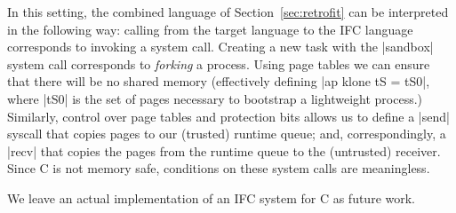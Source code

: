 In this setting, the combined language of Section~\ref{sec:retrofit}
can be interpreted in the following way: calling from the target
language to the IFC language corresponds to invoking a system call.
%
Creating a new task with the |sandbox| system call corresponds to
\emph{forking} a process.  Using page tables we can ensure that
there will be no shared memory
(effectively
defining |ap klone tS
= tS0|, where |tS0| is the set of pages necessary to bootstrap a
lightweight process.)
%
Similarly, control over page tables and protection bits allows us to
define a |send| syscall that copies pages to our
(trusted) runtime queue; and, correspondingly, a |recv| that copies
the pages from the runtime queue to the (untrusted) receiver.
%
Since C is not memory safe, conditions on these system calls are
meaningless.

We leave an actual implementation of an IFC system for C as
future work.
